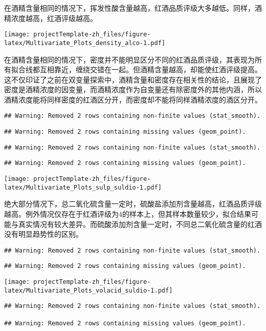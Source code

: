 \documentclass[]{article}
\begin{document}
在酒精含量相同的情况下，挥发性酸含量越高，红酒品质评级大多越低。同样，酒精浓度越高，红酒评级越高。

\texttt{[image: projectTemplate-zh\_files/figure-latex/Multivariate\_Plots\_density\_alco-1.pdf]}

在酒精含量相同的情况下，密度并不能明显区分不同的红酒品质评级，其表现为所有拟合线都互相靠近，缠绕交错在一起。但酒精含量越高，却能使红酒评级提高。这不仅印证了之前在双变量探索中，酒精含量和密度存在相关性的结论，且展现了密度是酒精浓度的因变量，而酒精浓度作为自变量还有除密度外的其他内涵，所以酒精浓度能将同样密度的红酒区分开，而密度却不能将同样酒精浓度的酒区分开。

\begin{verbatim}
## Warning: Removed 2 rows containing non-finite values (stat_smooth).
\end{verbatim}

\begin{verbatim}
## Warning: Removed 2 rows containing missing values (geom_point).
\end{verbatim}

\begin{verbatim}
## Warning: Removed 2 rows containing non-finite values (stat_smooth).
\end{verbatim}

\begin{verbatim}
## Warning: Removed 2 rows containing missing values (geom_point).
\end{verbatim}

\texttt{[image: projectTemplate-zh\_files/figure-latex/Multivariate\_Plots\_sulp\_suldio-1.pdf]}

绝大部分情况下，总二氧化硫含量一定时，硫酸盐添加剂含量越高，红酒品质评级越高。例外情况仅存在于红酒评级为4的样本上，但其样本数量较少，拟合结果可能与真实情况有较大差异。而硫酸添加剂含量一定时，不同总二氧化硫含量的红酒没有明显趋势性的区别。

\begin{verbatim}
## Warning: Removed 2 rows containing non-finite values (stat_smooth).
\end{verbatim}

\begin{verbatim}
## Warning: Removed 2 rows containing missing values (geom_point).
\end{verbatim}

\texttt{[image: projectTemplate-zh\_files/figure-latex/Multivariate\_Plots\_volacid\_suldio-1.pdf]}

\begin{verbatim}
## Warning: Removed 2 rows containing non-finite values (stat_smooth).

## Warning: Removed 2 rows containing missing values (geom_point).
\end{verbatim}
\end{document}
